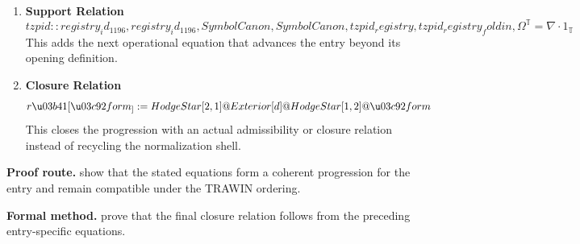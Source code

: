 \begin{enumerate}[leftmargin=1.6em,itemsep=9pt,topsep=6pt]
\item \textbf{Support Relation}
\[
tzpid::registry_id_1196,registry_id_1196,SymbolCanon,SymbolCanon,tzpid_registry,tzpid_registry_foldin,\Omega^{\mathbb{T}}=\nabla\cdot1_{\mathbb{T}}
\]
This adds the next operational equation that advances the entry beyond its opening definition.

\item \textbf{Closure Relation}
\[
r  \u03b41[\u03c92form_] := HodgeStar[2, 1] @ Exterior[d] @ HodgeStar[1, 2] @ \u03c92form
\]
This closes the progression with an actual admissibility or closure relation instead of recycling the normalization shell.
\end{enumerate}

\textbf{Proof route.} show that the stated equations form a coherent progression for the entry and remain compatible under the TRAWIN ordering.

\textbf{Formal method.} prove that the final closure relation follows from the preceding entry-specific equations.

\medskip
{}

\begin{tzpsnapshot}
\end{tzpsnapshot}

